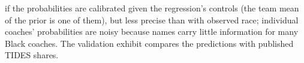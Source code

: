 {if the probabilities are calibrated given the regression's controls (the team mean of the prior is one of them), but less precise than with observed race; individual coaches' probabilities are noisy because names carry little information for many Black coaches. The validation exhibit compares the predictions with published TIDES shares.
\par}

